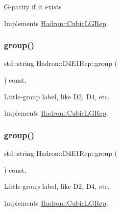 G-\/parity if it exists 

Implements \mbox{\hyperlink{structHadron_1_1CubicLGRep_ace26f7b2d55e3a668a14cb9026da5231}{Hadron\+::\+Cubic\+L\+G\+Rep}}.

\mbox{\label{structHadron_1_1D4E1Rep_a84c3427320fdc63f26dbb3bf4ff86286}} 
\subsubsection{\texorpdfstring{group()}{group()}\hspace{0.1cm}{\footnotesize\ttfamily [1/5]}}
{\footnotesize\ttfamily std\+::string Hadron\+::\+D4\+E1\+Rep\+::group (\begin{DoxyParamCaption}{ }\end{DoxyParamCaption}) const\hspace{0.3cm}{\ttfamily [inline]}, {\ttfamily [virtual]}}

Little-\/group label, like D2, D4, etc. 

Implements \mbox{\hyperlink{structHadron_1_1CubicLGRep_a9bdb14b519a611d21379ed96a3a9eb41}{Hadron\+::\+Cubic\+L\+G\+Rep}}.

\mbox{\label{structHadron_1_1D4E1Rep_a84c3427320fdc63f26dbb3bf4ff86286}} 
\subsubsection{\texorpdfstring{group()}{group()}\hspace{0.1cm}{\footnotesize\ttfamily [2/5]}}
{\footnotesize\ttfamily std\+::string Hadron\+::\+D4\+E1\+Rep\+::group (\begin{DoxyParamCaption}{ }\end{DoxyParamCaption}) const\hspace{0.3cm}{\ttfamily [inline]}, {\ttfamily [virtual]}}

Little-\/group label, like D2, D4, etc. 

Implements \mbox{\hyperlink{structHadron_1_1CubicLGRep_a9bdb14b519a611d21379ed96a3a9eb41}{Hadron\+::\+Cubic\+L\+G\+Rep}}.

\mbox{\label{structHadron_1_1D4E1Rep_a84c3427320fdc63f26dbb3bf4ff86286}} 
